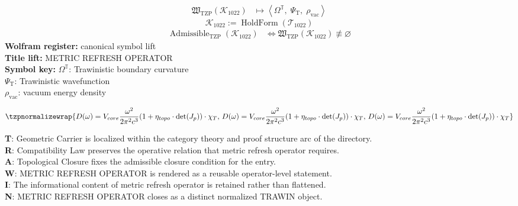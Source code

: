 \noindent
\begin{minipage}[t]{0.48\linewidth}
\begingroup
\small
\[
\begin{aligned}
\mathfrak{W}_{\mathrm{TZP}}\!\left(\mathcal{K}_{1022}\right)
&\longmapsto
\left\langle \Omega^{\mathbb{T}},\; \Psi_{\mathrm{T}},\; \rho_{\mathrm{vac}} \right\rangle
\end{aligned}
\]
\[
\mathcal{K}_{1022}
:=
\operatorname{HoldForm}\!\left(\mathcal{T}_{1022}\right)
\]
\[
\begin{aligned}
\operatorname{Admissible}_{\mathrm{TZP}}\!\left(\mathcal{K}_{1022}\right)
&\Longleftrightarrow
\mathfrak{W}_{\mathrm{TZP}}\!\left(\mathcal{K}_{1022}\right)\not\equiv\varnothing
\end{aligned}
\]
\textbf{Wolfram register:} canonical symbol lift\\
\textbf{Title lift:} METRIC REFRESH OPERATOR\\
\textbf{Symbol key:} \(\Omega^{\mathbb{T}}\): Trawinistic boundary curvature\\ \(\Psi_{\mathrm{T}}\): Trawinistic wavefunction\\ \(\rho_{\mathrm{vac}}\): vacuum energy density
\par
\endgroup
\end{minipage}\hfill
\begin{minipage}[t]{0.48\linewidth}
\[
\tzpnormalizewrap{D(\omega) = V_{core} \frac{\omega^2}{2\pi^2 c^3} (1 + \eta_{topo} \cdot \det(J_p)) \cdot \chi_T,\,D(\omega) = V_{core} \frac{\omega^2}{2\pi^2 c^3} (1 + \eta_{topo} \cdot \det(J_p)) \cdot \chi_T,\,D(\omega) = V_{core} \frac{\omega^2}{2\pi^2 c^3} (1 + \eta_{topo} \cdot \det(J_p)) \cdot \chi_T}
\]

\small
\textbf{T}: Geometric Carrier is localized within the category theory and proof structure arc of the directory.\\
\textbf{R}: Compatibility Law preserves the operative relation that metric refresh operator requires.\\
\textbf{A}: Topological Closure fixes the admissible closure condition for the entry.\\
\textbf{W}: METRIC REFRESH OPERATOR is rendered as a reusable operator-level statement.\\
\textbf{I}: The informational content of metric refresh operator is retained rather than flattened.\\
\textbf{N}: METRIC REFRESH OPERATOR closes as a distinct normalized TRAWIN object.
\normalsize
\end{minipage}

